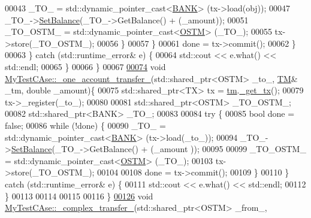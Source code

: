 \begin{DoxyCode}
00043                     \_TO\_ = std::dynamic\_pointer\_cast<\hyperlink{class_b_a_n_k}{BANK}> (tx->load(obj));
00047                     \_TO\_->\hyperlink{class_b_a_n_k_ae3e45b407bf8ec7175662442ea24b7c0_ae3e45b407bf8ec7175662442ea24b7c0}{SetBalance}(\_TO\_->GetBalance() + (\_amount));
00051                     \_TO\_OSTM\_ = std::dynamic\_pointer\_cast<\hyperlink{class_o_s_t_m}{OSTM}> (\_TO\_);
00055                     tx->store(\_TO\_OSTM\_);
00056                 \}
00057             \}
00061             done = tx->commit();
00062         \}
00063     \} \textcolor{keywordflow}{catch} (std::runtime\_error& e) \{
00064         std::cout << e.what() << std::endl;
00065     \}
00066 \}
00067 
\hypertarget{_my_test_c_ase_8cpp_source.tex_l00074}{}\hyperlink{class_my_test_c_ase_afe25c2ed3a8ab035f472fff6575f0e48_afe25c2ed3a8ab035f472fff6575f0e48}{00074} \textcolor{keywordtype}{void} \hyperlink{class_my_test_c_ase_afe25c2ed3a8ab035f472fff6575f0e48_afe25c2ed3a8ab035f472fff6575f0e48}{MyTestCAse::\_one\_account\_transfer\_}(std::shared\_ptr<OSTM> \_to\_, 
      \hyperlink{class_t_m}{TM}& \_tm, \textcolor{keywordtype}{double} \_amount)\{
00075      std::shared\_ptr<TX> tx = \hyperlink{class_my_test_c_ase_a422e6e5d4ddedea384be96031c89b72b_a422e6e5d4ddedea384be96031c89b72b}{tm}.\hyperlink{class_t_m_a41cb0226cc4080c931651b13f74a0075_a41cb0226cc4080c931651b13f74a0075}{\_get\_tx}();
00079     tx->\_register(\_to\_);
00080     
00081     std::shared\_ptr<OSTM> \_TO\_OSTM\_;
00082     std::shared\_ptr<BANK> \_TO\_;
00083     
00084     \textcolor{keywordflow}{try} \{
00085         \textcolor{keywordtype}{bool} done = \textcolor{keyword}{false};
00086         \textcolor{keywordflow}{while} (!done) \{
00090             \_TO\_ = std::dynamic\_pointer\_cast<\hyperlink{class_b_a_n_k}{BANK}> (tx->load(\_to\_));
00094             \_TO\_->\hyperlink{class_b_a_n_k_ae3e45b407bf8ec7175662442ea24b7c0_ae3e45b407bf8ec7175662442ea24b7c0}{SetBalance}(\_TO\_->GetBalance() + (\_amount ));
00095 
00099             \_TO\_OSTM\_ = std::dynamic\_pointer\_cast<\hyperlink{class_o_s_t_m}{OSTM}> (\_TO\_);
00103             tx->store(\_TO\_OSTM\_);
00104 
00108             done = tx->commit();
00109         \}
00110     \} \textcolor{keywordflow}{catch} (std::runtime\_error& e) \{
00111         std::cout << e.what() << std::endl;
00112     \}
00113     
00114     
00115     
00116 \}
\hypertarget{_my_test_c_ase_8cpp_source.tex_l00126}{}\hyperlink{class_my_test_c_ase_a2367b87338c4f61cc3ac3193651580d4_a2367b87338c4f61cc3ac3193651580d4}{00126} \textcolor{keywordtype}{void} \hyperlink{class_my_test_c_ase_a2367b87338c4f61cc3ac3193651580d4_a2367b87338c4f61cc3ac3193651580d4}{MyTestCAse::\_complex\_transfer\_}(std::shared\_ptr<OSTM> \_from\_, 

\end{DoxyCode}
